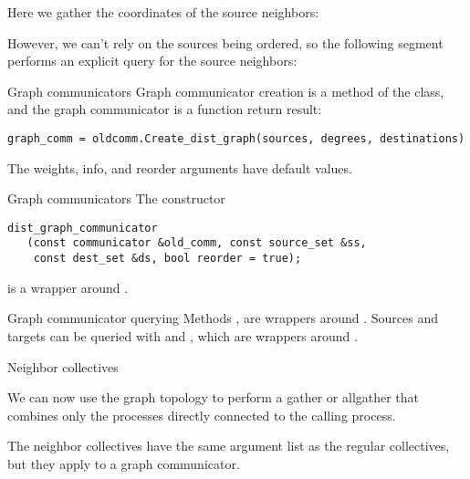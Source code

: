 Here we gather the coordinates of the source neighbors:

{
  \def\snippetcodefraction{.45}
  \def\snippetlistfraction{.5}
}

However, we can't rely on the sources being ordered,
so the following segment performs an explicit query for the
source neighbors:

{
  \def\snippetcodefraction{.45}
  \def\snippetlistfraction{.5}
}

\begin{pythonnote}{Graph communicators}
  Graph communicator creation is a method of the  class,
  and the graph communicator is a function return result:
\begin{lstlisting}
graph_comm = oldcomm.Create_dist_graph(sources, degrees, destinations)
\end{lstlisting}
  The weights, info, and reorder arguments have default values.
\end{pythonnote}

\begin{mplnote}{Graph communicators}
  \label{mpl:graph-comm}
  The constructor 
\begin{lstlisting}
dist_graph_communicator
   (const communicator &old_comm, const source_set &ss,
    const dest_set &ds, bool reorder = true);    
\end{lstlisting}
is a wrapper around .
\end{mplnote}
\begin{mplnote}{Graph communicator querying}
  \label{mpl:graph-query}
  Methods , 
  are wrappers around .
  Sources and targets can be queried with
   and ,
  which are wrappers around .
\end{mplnote}

 {Neighbor collectives}
\label{sec:mpi-neigh-coll}

We can now use the graph topology to perform a gather or allgather
that combines only the processes directly connected to the calling
process.

The neighbor collectives have the same argument list as the regular
collectives, but they apply to a graph communicator.

